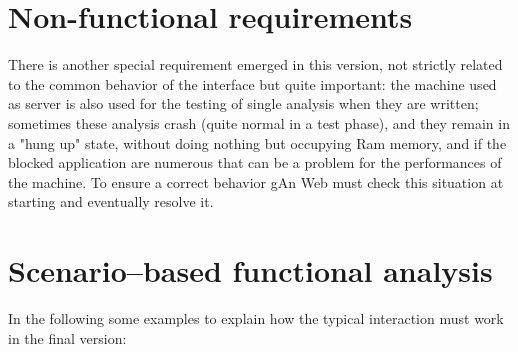 \section{Non-functional requirements}

There is another special requirement emerged in this version, not strictly related to the common behavior of the interface but quite important: the machine  used as server is also used for the testing of single analysis when they are written; sometimes these analysis crash (quite normal in a test phase), and they remain in a "hung up" state, without doing nothing but occupying Ram memory, and if the blocked application are numerous that can be a problem for the performances of the machine. To ensure a correct behavior gAn Web must check this situation at starting and eventually resolve it.

\section{Scenario--based functional analysis}
In the following some examples to explain how the typical interaction must work in the final version:


